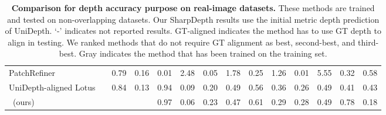 \begin{table}
{\begin{tabular}{lc cc cc cc cc cc cc}
        PatchRefiner \cite{li2025patchrefiner} & & 0.79 & 0.16 & 0.01 & 2.48 & 0.05 & 1.78 & 0.25 & 1.26 & 0.01 & 5.55 & 0.32 & 0.58 \\
        UniDepth-aligned Lotus & & \cellcolor{tabthird!170}0.84 & \cellcolor{tabthird!170}0.13 & \cellcolor{tabthird!170}0.94 & 0.09 & 0.20 & 0.49 & 0.56 & 0.36 & \cellcolor{tabsecond!170} 0.26 & \cellcolor{tabfirst!170} 0.49 & \cellcolor{tabthird!170} 0.41 & 0.43\\
        \midrule
        ~(ours) &  &  \cellcolor{tabsecond!170}{0.97} & \cellcolor{tabsecond!170}{0.06} & \cellcolor{tabsecond!170} 0.97 & \cellcolor{tabsecond!170}0.06 & 0.23 & \cellcolor{tabthird!170} 0.47 & \cellcolor{tabthird!170} 0.61 & \cellcolor{tabthird!170} 0.29 & \cellcolor{tabfirst!170} 0.28 &\cellcolor{tabfirst!170} 0.49 & \cellcolor{tabsecond!170} 0.78 & \cellcolor{tabsecond!170} 0.18 \\
        \bottomrule
    \end{tabular}
    }
    \vspace{-3pt}
    \caption{\textbf{Comparison for depth accuracy purpose on real-image datasets.} These methods are trained and tested on non-overlapping datasets. Our SharpDepth results use the initial metric depth prediction of UniDepth. `-' indicates not reported results. GT-aligned indicates the method has to use GT depth to align in testing. We ranked methods that do not require GT alignment as \colorbox{tabfirst!170}{best}, \colorbox{tabsecond!170}{second-best}, and \colorbox{tabthird!170}{third-best}. \colorbox{gray!50}{Gray} indicates the method that has been trained on the training set.}
    \label{tab:results:zeroshot:metric}
\end{table}

